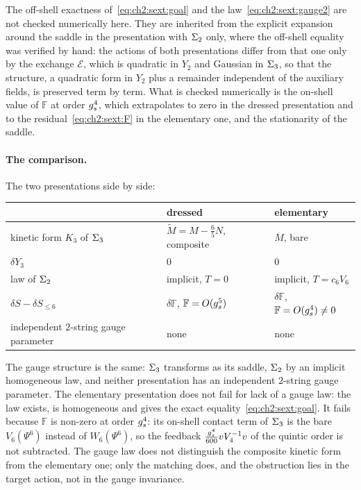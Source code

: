 The off-shell exactness of~\eqref{eq:ch2:sext:goal} and the law~\eqref{eq:ch2:sext:gauge2} are not checked numerically here.
They are inherited from the explicit expansion around the saddle in the presentation with $\Sigma_2$ only, where the off-shell equality was verified by hand: the actions of both presentations differ from that one only by the exchange $\mathcal E$, which is quadratic in $Y_2$ and Gaussian in $\Sigma_3$, so that the structure, a quadratic form in $Y_2$ plus a remainder independent of the auxiliary fields, is preserved term by term.
What is checked numerically is the on-shell value of $\mathbb F$ at order $g_s^4$, which extrapolates to zero in the dressed presentation and to the residual~\eqref{eq:ch2:sext:F} in the elementary one, and the stationarity of the saddle.

\paragraph{The comparison.}
The two presentations side by side:
\begin{center}
  \small
  \begin{tabular}{lll}
    \toprule
                                                & dressed                                          & elementary                               \\
    \midrule
    kinetic form $K_3$ of $\Sigma_3$              & $\tilde M = M - \tfrac65 N$, composite           & $M$, bare                                \\
    $\delta Y_3$                                & $0$                                              & $0$                                      \\
    law of $\Sigma_2$                             & implicit, $T = 0$                                & implicit, $T = c_6 V_6$                  \\
    $\delta S - \delta S_{\le 6}$               & $\delta \mathbb F$, $\mathbb F = O(g_s^5)$       & $\delta \mathbb F$, $\mathbb F = O(g_s^4) \ne 0$ \\
    independent $2$-string gauge parameter      & none                                             & none                                     \\
    \bottomrule
  \end{tabular}
\end{center}
The gauge structure is the same: $\Sigma_3$ transforms as its saddle, $\Sigma_2$ by an implicit homogeneous law, and neither presentation has an independent $2$-string gauge parameter.
The elementary presentation does not fail for lack of a gauge law: the law exists, is homogeneous and gives the exact equality~\eqref{eq:ch2:sext:goal}.
It fails because $\mathbb F$ is non-zero at order $g_s^4$: its on-shell contact term of $\Sigma_3$ is the bare $V_6(\Psi^6)$ instead of $W_6(\Psi^6)$, so the feedback $\tfrac{g_s^4}{600} v V_4^{-1} v$ of the quintic order is not subtracted.
The gauge law does not distinguish the composite kinetic form from the elementary one; only the matching does, and the obstruction lies in the target action, not in the gauge invariance.

